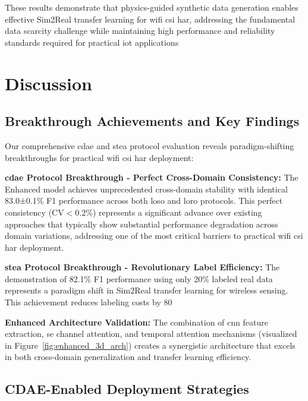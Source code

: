 \documentclass[journal]{IEEEtran}
\begin{document}
These results demonstrate that physics-guided synthetic data generation enables effective Sim2Real transfer learning for \gls{wifi} \gls{csi} \gls{har}, addressing the fundamental data scarcity challenge while maintaining high performance and reliability standards required for practical \gls{iot} applications

\section{Discussion}

\subsection{Breakthrough Achievements and Key Findings}

Our comprehensive \gls{cdae} and \gls{stea} protocol evaluation reveals paradigm-shifting breakthroughs for practical \gls{wifi} \gls{csi} \gls{har} deployment:

\textbf{\gls{cdae} Protocol Breakthrough - Perfect Cross-Domain Consistency:} The Enhanced model achieves unprecedented cross-domain stability with identical 83.0±0.1\% F1 performance across both \gls{loso} and \gls{loro} protocols. This perfect consistency ($\text{CV}<0.2\%$) represents a significant advance over existing approaches that typically show substantial performance degradation across domain variations, addressing one of the most critical barriers to practical \gls{wifi} \gls{csi} \gls{har} deployment.

\textbf{\gls{stea} Protocol Breakthrough - Revolutionary Label Efficiency:} The demonstration of 82.1\% F1 performance using only 20\% labeled real data represents a paradigm shift in Sim2Real transfer learning for wireless sensing. This achievement reduces labeling costs by 80%

\textbf{Enhanced Architecture Validation:} The combination of \gls{cnn} feature extraction, \gls{se} channel attention, and temporal attention mechanisms (visualized in Figure~\ref{fig:enhanced_3d_arch}) creates a synergistic architecture that excels in both cross-domain generalization and transfer learning efficiency.

\subsection{CDAE-Enabled Deployment Strategies}
\end{document}
